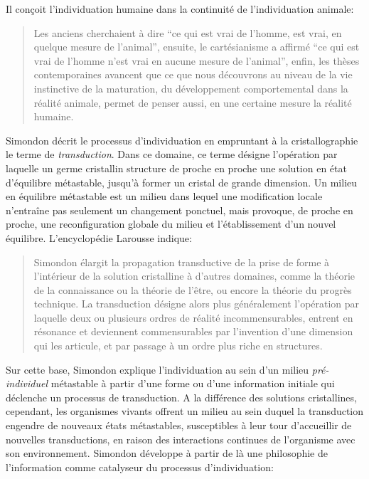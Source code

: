 Il conçoit l'individuation humaine dans la continuité de l'individuation animale: 

\begin{quote}
\og Les anciens cherchaient à dire ``ce qui est vrai de l'homme, est vrai, en quelque mesure de l'animal'', ensuite, le cartésianisme a affirmé  ``ce qui est vrai de l'homme n'est vrai en aucune mesure de l'animal'', enfin, les thèses contemporaines avancent que ce que nous découvrons au niveau de la vie instinctive de la maturation, du développement comportemental dans la réalité animale, permet de penser aussi, en une certaine mesure la réalité humaine. \fg\
\cite{simondon_deux_2004}
\end{quote}



Simondon décrit le processus d'individuation en empruntant à la cristallographie le terme de \emph{transduction}. 
Dans ce domaine, ce terme désigne l'opération par laquelle un germe cristallin structure de proche en proche une solution en état d'équilibre métastable, jusqu'à former un cristal de grande dimension. 
Un milieu en équilibre métastable est un milieu dans lequel une modification locale n'entraîne pas seulement un changement ponctuel, mais provoque, de proche en proche, une reconfiguration globale du milieu et l'établissement d’un nouvel équilibre.
L'encyclopédie Larousse indique: 

\begin{quote}
	Simondon élargit la propagation transductive de la prise de forme à l'intérieur de la solution cristalline à d'autres domaines, comme la théorie de la connaissance ou la théorie de l'être, ou encore la théorie du progrès technique. La transduction désigne alors plus généralement l'opération par laquelle deux ou plusieurs ordres de réalité incommensurables, entrent en résonance et deviennent commensurables par l'invention d'une dimension qui les articule, et par passage à un ordre plus riche en structures.
\end{quote}

Sur cette base, Simondon explique l'individuation au sein d'un milieu \emph{pré-individuel} métastable à partir d'une forme ou d'une information initiale qui déclenche un processus de transduction. 
A la différence des solutions cristallines, cependant, les organismes vivants offrent un milieu au sein duquel la transduction engendre de nouveaux états métastables, susceptibles à leur tour d'accueillir de nouvelles transductions, en raison des interactions continues de l'organisme avec son environnement.
Simondon développe à partir de là une philosophie de l'information comme catalyseur du processus d'individuation: 

